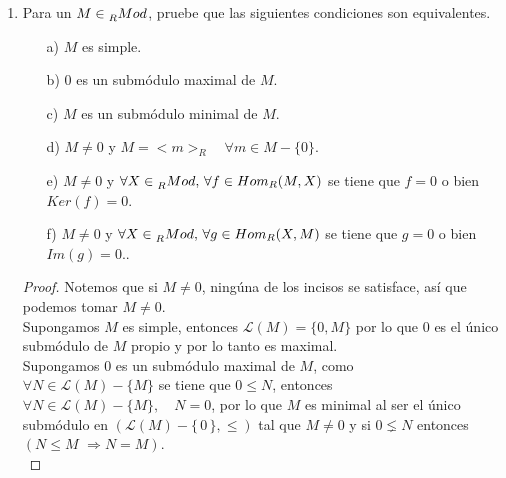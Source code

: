 \documentclass{article}
\newcommand{\La}{\mathscr{L}}
\newcommand{\lrprth}[1]{
	\left(#1\right)
}
\newcommand{\descset}[3]{
	\left\{#1\in#2\ \vline\ #3\right\}
}
\theoremstyle{definition}
\theoremstyle{plain}
\theoremstyle{plain}
\theoremstyle{definition}
\theoremstyle{definition}
\theoremstyle{definition}
\theoremstyle{definition}
\theoremstyle{definition}
\theoremstyle{definition}
\begin{document}
\begin{enumerate}[label=\textbf{Ej \arabic*.}]
\begin{proof}
	Por último, observe que
	\begin{align*}
		\widehat{\pi}_{N} \lrprth{ \widehat{\pi}_{N}^{-1} \lrprth{T}}&=\descset{x+N}{M/N}{x \in \widehat{\pi}_{N}^{-1} \lrprth{T}}\\
		&=\descset{x+N}{M/N}{x \in T}\\
		&=T.
	\end{align*}
	Más aún, para cualesquiera $T_{1},T_{2} \in L\lrprth{M/N}$, se identifican
	\begin{align*}
		\widehat{\pi}_{N}^{-1} \lrprth{T_{1} \cap T_{2}} &= \widehat{\pi}_{N}^{-1} \lrprth{T_{1}} \cap \widehat{\pi}_{N}^{-1} \lrprth{T_{2}}\\
		\intertext{y}
		\widehat{\pi}_{N}^{-1} \lrprth{T_{1}+T_{2}} &= \widehat{\pi}_{N}^{-1} \lrprth{T_{1}} + \widehat{\pi}_{N}^{-1} \lrprth{T_{2}}.
	\end{align*}
	$\therefore\ \widehat{\pi}_{N}$ es un isomorfismo de retículas.\\
\end{proof}
\item Para un $M\in \prescript{}{R}{Mod}$, pruebe que las siguientes condiciones son equivalentes.
\begin{itemize}
	\item[a)]  $M$ es simple.
	\item[b)]  $0$ es un submódulo maximal de $M$.
	\item[c)]  $M$ es un submódulo minimal de $M$.
	\item[d)]  $M\neq 0$ y $M=<m>_R\quad \forall m\in M-\{0\}$.
	\item[e)]  $M\neq 0$ y $\forall X\in \prescript{}{R}{Mod}, \,\forall f\in Hom_R(M,X)$ se tiene que $f=0$ o bien 
	$Ker(f)=0$.
	\item[f)]  $M\neq 0$ y $\forall X\in \prescript{}{R}{Mod}, \,\forall g\in Hom_R(X,M)$ se tiene que $g=0$ o bien 
	$Im(g)=0$..
\end{itemize}
\begin{proof}
	Notemos que si $M\neq 0$, ningúna de los incisos se satisface, así que podemos tomar $M\neq 0$.\\
	
	 Supongamos $M$ es simple, entonces $\La(M)=\{0,M\}$ por lo que $0$ es el único
	submódulo de $M$ propio y por lo tanto es maximal.\\
	
	 Supongamos $0$ es un submódulo maximal de $M$, como \\ $\forall N\in \La(M)-\{M\}$ se tiene 
	que $0\leq  N$, entonces \\ $\forall N\in\La(M)-\{M\},\quad N=0$, por lo que $M$ es minimal al ser el único submódulo en 
	$\left(\La(M)-\{\,0\,\},\leq \right)$ tal que $M\neq 0$ y si $0\lneq N$ entonces \quad $\left(N\leq M\,\,\Rightarrow N=M\right)$.\\
	

\end{proof}
\end{enumerate}
\end{document}

